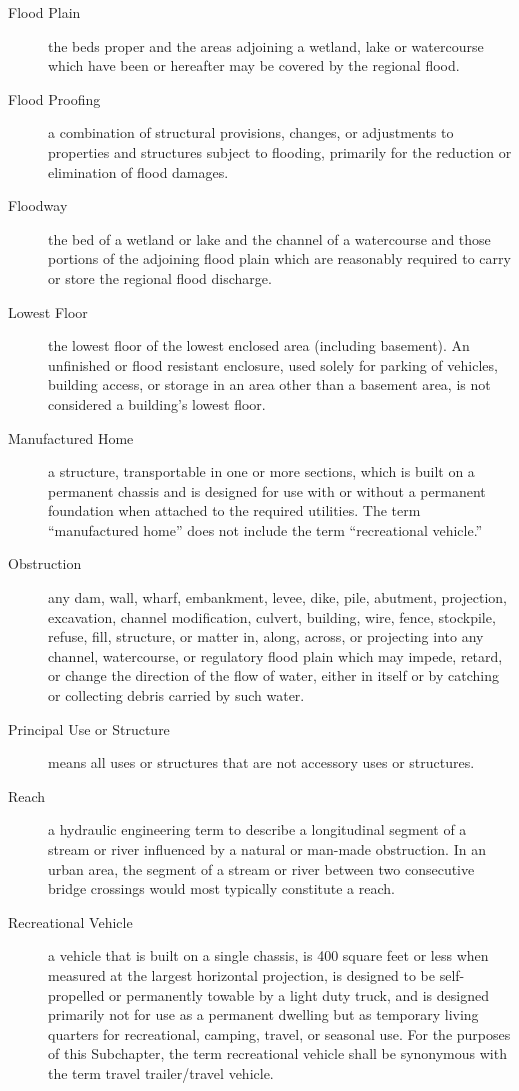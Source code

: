 \begin{description}
    \item[Flood Plain] the beds proper and the areas adjoining a wetland, lake or watercourse which have been or hereafter may be covered by the regional flood.
    \item[Flood Proofing] a combination of structural provisions, changes, or adjustments to properties and structures subject to flooding, primarily for the reduction or elimination of flood damages.
    \item[Floodway] the bed of a wetland or lake and the channel of a watercourse and those portions of the adjoining flood plain which are reasonably required to carry or store the regional flood discharge.
    \item[Lowest Floor] the lowest floor of the lowest enclosed area (including basement). An unfinished or flood resistant enclosure, used solely for parking of vehicles, building access, or storage in an area other than a basement area, is not considered a building’s lowest floor.
    \item[Manufactured Home] a structure, transportable in one or more sections, which is built on a permanent chassis and is designed for use with or without a permanent foundation when attached to the required utilities. The term “manufactured home” does not include the term “recreational vehicle.”
    \item[Obstruction] any dam, wall, wharf, embankment, levee, dike, pile, abutment, projection, excavation, channel modification, culvert, building, wire, fence, stockpile, refuse, fill, structure, or matter in, along, across, or projecting into any channel, watercourse, or regulatory flood plain which may impede, retard, or change the direction of the flow of water, either in itself or by catching or collecting debris carried by such water.
    \item[Principal Use or Structure] means all uses or structures that are not accessory uses or structures.
    \item[Reach] a hydraulic engineering term to describe a longitudinal segment of a stream or river influenced by a natural or man-made obstruction. In an urban area, the segment of a stream or river between two consecutive bridge crossings would most typically constitute a reach.
    \item[Recreational Vehicle] a vehicle that is built on a single chassis, is 400 square feet or less when measured at the largest horizontal projection, is designed to be self-propelled or permanently towable by a light duty truck, and is designed primarily not for use as a permanent dwelling but as temporary living quarters for recreational, camping, travel, or seasonal use. For the purposes of this Subchapter, the term recreational vehicle shall be synonymous with the term travel trailer/travel vehicle.

\end{description}
